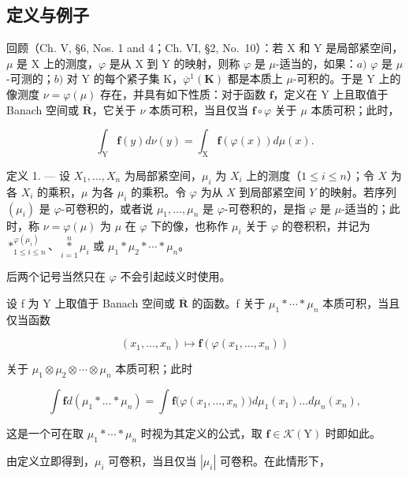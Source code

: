 \subsection{定义与例子}

回顾（Ch. V, §6, Nos. 1 and 4；Ch. VI, §2, No.~10）：若 X 和 Y 是局部紧空间，\(\mu\) 是 X 上的测度，\(\varphi\) 是从 X 到 Y 的映射，则称 \(\varphi\) 是 \(\mu\)-适当的，如果：\(a)\) \(\varphi\) 是 \(\mu\)-可测的；\(b)\) 对 Y 的每个紧子集 K，\(\overline{\varphi}^1 (\mathbf{K})\) 都是本质上 \(\mu\)-可积的。于是 Y 上的像测度 \(\nu = \varphi (\mu)\) 存在，并具有如下性质：对于函数 \(\mathbf{f}\)，定义在 Y 上且取值于 Banach 空间或 \(\overline{\mathbf{R}}\)，它关于 \(\nu\) 本质可积，当且仅当 \(\mathbf{f} \circ \varphi\) 关于 \(\mu\) 本质可积；此时，

\[
\int_ {\mathrm{Y}} \mathbf {f} (y) d \nu (y) = \int_ {\mathrm{X}} \mathbf {f} (\varphi (x)) d \mu (x).
\]

定义 1. --- 设 \(X_1, \ldots, X_n\) 为局部紧空间，\(\mu_i\) 为 \(X_i\) 上的测度（\(1 \leqslant i \leqslant n\)）；令 \(X\) 为各 \(X_i\) 的乘积，\(\mu\) 为各 \(\mu_i\) 的乘积。令 \(\varphi\) 为从 \(X\) 到局部紧空间 \(Y\) 的映射。若序列 \((\mu_i)\) 是 \(\varphi\)-可卷积的，或者说 \(\mu_1, \ldots, \mu_n\) 是 \(\varphi\)-可卷积的，是指 \(\varphi\) 是 \(\mu\)-适当的；此时，称 \(\nu = \varphi(\mu)\) 为 \(\mu\) 在 \(\varphi\) 下的像，也称作 \(\mu_i\) 关于 \(\varphi\) 的卷积积，并记为 \(*^{\varphi(\mu_i)}_{1 \leqslant i \leqslant n}\)、\(\underset{i=1}{\overset{n}{*}} \mu_i\) 或 \(\mu_1 * \mu_2 * \cdots * \mu_n\)。

后两个记号当然只在 \(\varphi\) 不会引起歧义时使用。

设 f 为 Y 上取值于 Banach 空间或 \(\overline{\mathbf{R}}\) 的函数。f 关于 \(\mu_{1}*\cdots*\mu_{n}\) 本质可积，当且仅当函数

\[
\left(x _ {1}, \dots , x _ {n}\right) \mapsto \mathbf {f} \left(\varphi \left(x _ {1}, \dots , x _ {n}\right)\right)
\]

关于 \(\mu_{1}\otimes\mu_{2}\otimes\cdots\otimes\mu_{n}\) 本质可积；此时

\[
\int \mathbf {f} d (\mu_ {1} * \dots * \mu_ {n}) = \int \mathbf {f} \big (\varphi (x _ {1}, \ldots , x _ {n}) \big) d \mu_ {1} (x _ {1}) \ldots d \mu_ {n} (x _ {n}),\tag{1}
\]

这是一个可在取 \(\mu_{1}*\cdots *\mu_{n}\) 时视为其定义的公式，取 \(\mathbf{f}\in\mathcal{K}(\mathrm{Y})\) 时即如此。

由定义立即得到，\(\mu_{i}\) 可卷积，当且仅当 \(|\mu_{i}|\) 可卷积。在此情形下，

